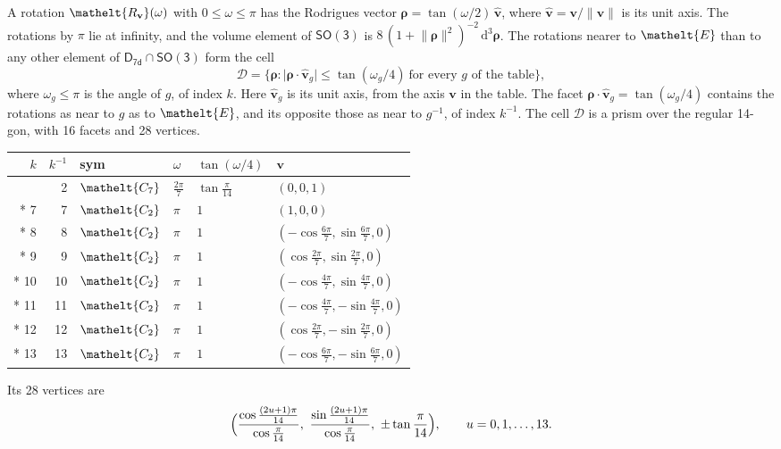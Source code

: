 \documentclass[10pt,a4paper]{article}
\numberwithin{equation}{section}
\newcommand{\eltfont}[1]{{\let\sigma\eltsigma\mathelt{#1}}}
\newcommand{\grp}[1]{\mathsf{#1}}
\newcommand{\cls}[1]{\eltfont{#1}}
\newcommand{\elt}[1]{\eltfont{#1}}
\newcommand{\dirvec}[3]{(#1, #2, #3)}
\newcommand{\unitaxis}{\hat{\mathbf{v}}}
\newcommand{\vv}{\mathbf{v}}
\newcommand{\diff}{\mathrm{d}}
\newcommand{\rodrigues}{\boldsymbol{\rho}}
\newcommand{\fcell}{\mathcal{D}}
\begin{document}
\leavevmode\label{n:vector.rodrigues}\label{n:vector.unitaxis}A rotation $\elt{R_{\vv}}(\omega)$ with $0 \le \omega \le \pi$ has the Rodrigues vector $\rodrigues = \tan(\omega/2)\,\unitaxis$, where $\unitaxis = \vv/\lVert\vv\rVert$ is its unit axis. The rotations by $\pi$ lie at infinity, and the volume element of \href{SO3.pdf}{$\grp{SO(3)}$} is $8\,(1 + \lVert\rodrigues\rVert^2)^{-2}\,\diff^3\rodrigues$.
\leavevmode\label{n:set.cell}The rotations nearer to $\elt{E}$ than to any other element of $\grp{D_{7d}} \cap \grp{SO(3)}$ form the cell
\begin{equation}\label{e:cell}\fcell = \bigl\{\rodrigues : \lvert\rodrigues\cdot\unitaxis_g\rvert \le \tan(\omega_g/4)\ \text{for every $g$ of the table}\bigr\},\end{equation}
where $\omega_g \le \pi$ is the angle of $g$, of index $k$. Here $\unitaxis_g$ is its unit axis, from the axis $\vv$ in the table. The facet $\rodrigues\cdot\unitaxis_g = \tan(\omega_g/4)$ contains the rotations as near to $g$ as to $\elt{E}$, and its opposite those as near to $g^{-1}$, of index $k^{-1}$. The cell $\fcell$ is a prism over the regular 14-gon, with 16 facets and 28 vertices.
{\small{\renewcommand{\arraystretch}{1.3}\begin{longtable}{@{}rrllll@{}}\toprule
$k$ & $k^{-1}$ & sym & $\omega$ & $\tan(\omega/4)$ & $\vv$\\\midrule\endhead
\bottomrule\endfoot\endlastfoot
1 & 2 & $\cls{C_{7}}$ & $\tfrac{2\pi}{7}$ & $\tan\tfrac{\pi}{14}$ & $\dirvec{0}{0}{1}$\\*
7 & 7 & $\cls{C_{2}}$ & $\pi$ & $1$ & $\dirvec{1}{0}{0}$\\*
8 & 8 & $\cls{C_{2}}$ & $\pi$ & $1$ & $\dirvec{-\cos\tfrac{6\pi}{7}}{\sin\tfrac{6\pi}{7}}{0}$\\*
9 & 9 & $\cls{C_{2}}$ & $\pi$ & $1$ & $\dirvec{\cos\tfrac{2\pi}{7}}{\sin\tfrac{2\pi}{7}}{0}$\\*
10 & 10 & $\cls{C_{2}}$ & $\pi$ & $1$ & $\dirvec{-\cos\tfrac{4\pi}{7}}{\sin\tfrac{4\pi}{7}}{0}$\\*
11 & 11 & $\cls{C_{2}}$ & $\pi$ & $1$ & $\dirvec{-\cos\tfrac{4\pi}{7}}{-\sin\tfrac{4\pi}{7}}{0}$\\*
12 & 12 & $\cls{C_{2}}$ & $\pi$ & $1$ & $\dirvec{\cos\tfrac{2\pi}{7}}{-\sin\tfrac{2\pi}{7}}{0}$\\*
13 & 13 & $\cls{C_{2}}$ & $\pi$ & $1$ & $\dirvec{-\cos\tfrac{6\pi}{7}}{-\sin\tfrac{6\pi}{7}}{0}$\\
\bottomrule\end{longtable}}}
\leavevmode\label{n:local.vertex.u}Its 28 vertices are
\begin{equation}\label{e:prism}\Bigl(\frac{\cos\frac{(2u+1)\pi}{14}}{\cos\frac{\pi}{14}},\ \frac{\sin\frac{(2u+1)\pi}{14}}{\cos\frac{\pi}{14}},\ \pm\tan\frac{\pi}{14}\Bigr),\qquad u = 0, 1, \dots, 13.\end{equation}
\end{document}
